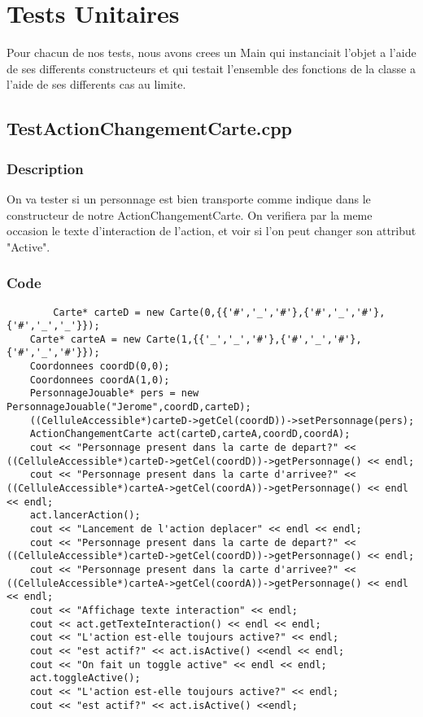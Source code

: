 \chapter{Tests Unitaires}
    Pour chacun de nos tests, nous avons crees un Main qui instanciait l'objet a l'aide de ses differents constructeurs et qui testait l'ensemble des fonctions de la classe a l'aide de ses differents cas au limite.
    \section{TestActionChangementCarte.cpp}
        \subsection{Description}
            On va tester si un personnage est bien transporte comme indique dans le constructeur de notre ActionChangementCarte. On verifiera par la meme occasion le texte d'interaction de l'action, et voir si l'on peut changer son attribut "Active".
        \subsection{Code}
	\begin{lstlisting}
		Carte* carteD = new Carte(0,{{'#','_','#'},{'#','_','#'},{'#','_','_'}});
	Carte* carteA = new Carte(1,{{'_','_','#'},{'#','_','#'},{'#','_','#'}});
	Coordonnees coordD(0,0);
	Coordonnees coordA(1,0);
	PersonnageJouable* pers = new PersonnageJouable("Jerome",coordD,carteD);
	((CelluleAccessible*)carteD->getCel(coordD))->setPersonnage(pers);
	ActionChangementCarte act(carteD,carteA,coordD,coordA);
	cout << "Personnage present dans la carte de depart?" << ((CelluleAccessible*)carteD->getCel(coordD))->getPersonnage() << endl;
	cout << "Personnage present dans la carte d'arrivee?" << ((CelluleAccessible*)carteA->getCel(coordA))->getPersonnage() << endl << endl;
	act.lancerAction();
	cout << "Lancement de l'action deplacer" << endl << endl;
	cout << "Personnage present dans la carte de depart?" << ((CelluleAccessible*)carteD->getCel(coordD))->getPersonnage() << endl;
	cout << "Personnage present dans la carte d'arrivee?" << ((CelluleAccessible*)carteA->getCel(coordA))->getPersonnage() << endl << endl;
	cout << "Affichage texte interaction" << endl;
	cout << act.getTexteInteraction() << endl << endl;
	cout << "L'action est-elle toujours active?" << endl;
	cout << "est actif?" << act.isActive() <<endl << endl;
	cout << "On fait un toggle active" << endl << endl;
	act.toggleActive();
	cout << "L'action est-elle toujours active?" << endl;
	cout << "est actif?" << act.isActive() <<endl;
	\end{lstlisting}
